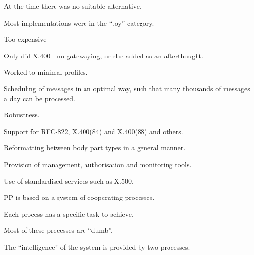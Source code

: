 \begin{bwslide}
\begin{nrtc}
\item At the time there was no suitable alternative.

\item Most implementations were in the ``toy'' category.

\item Too expensive

\item Only did X.400 - no gatewaying, or else added as an
afterthought.

\item Worked to minimal profiles.
\end{nrtc}
\end{bwslide}

\begin{bwslide}
\begin{nrtc}
\item	Scheduling of messages in an optimal way, such that many
thousands of messages a day can be processed.

\item	Robustness.

\item	Support for RFC-822, X.400(84) and X.400(88) and others.

\item	Reformatting between body part types in a general manner.

\item	Provision of management, authorisation and monitoring tools.

\item	Use of standardised services such as X.500.
\end{nrtc}
\end{bwslide}

\begin{bwslide}
\begin{nrtc}
\item	PP is based on a system of cooperating processes.

\item	Each process has a specific task to achieve.

\item	Most of these processes are ``dumb''.

\item	The ``intelligence'' of the system is provided by two processes.

\end{nrtc}
\end{bwslide}

